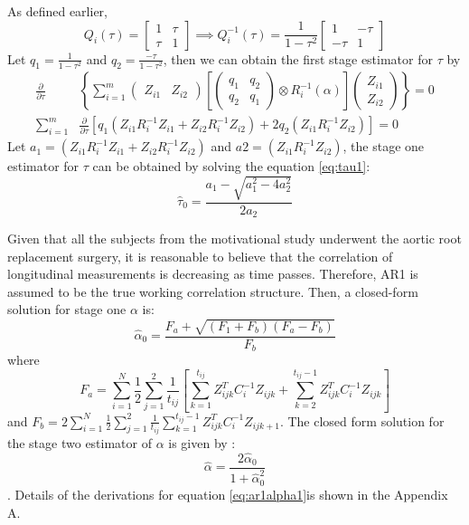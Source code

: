 \documentclass[
]{aft}
\begin{document}
As defined earlier, \[
Q_i(\tau) = 
\begin{bmatrix}
1 & \tau\\
\tau & 1
\end{bmatrix}
\implies 
Q_i^{-1}(\tau) = \frac{1}{1-\tau^2}
\begin{bmatrix}
1 & -\tau\\
-\tau & 1
\end{bmatrix}
\] Let \(q_1 = \frac{1}{1-\tau^2}\) and
\(q_2 = \frac{-\tau}{1-\tau^2}\), then we can obtain the first stage
estimator for \(\tau\) by \begin{align}
\frac{\partial}{\partial \tau}& \left\{
\sum_{i=1}^m 
\begin{pmatrix}
Z_{i1} & Z_{i2}
\end{pmatrix} 
\left[\begin{pmatrix}
q_1 & q_2\\
q_2 & q_1
\end{pmatrix} 
\otimes R_i^{-1}(\alpha)\right] 
\begin{pmatrix}
Z_{i1}\\ Z_{i2}
\end{pmatrix} \right\} = 0 \\
\sum_{i=1}^m &  \frac{\partial}{\partial \tau}\left[q_1(Z_{i1}R_i^{-1}Z_{i1}+Z_{i2}R_i^{-1}Z_{i2}) + 2q_2(Z_{i1}R_i^{-1}Z_{i2})\right]= 0 \label{eq:tau1}
\end{align} Let \(a_1 = (Z_{i1}R_i^{-1}Z_{i1}+Z_{i2}R_i^{-1}Z_{i2})\)
and \(a2 = (Z_{i1}R_i^{-1}Z_{i2})\), the stage one estimator for
\(\tau\) can be obtained by solving the equation \eqref{eq:tau1}: \[
\hat{\tau}_0 = \frac{a_1 - \sqrt{a_1^2 - 4a_2^2}}{2a_2}
\]

Given that all the subjects from the motivational study underwent the
aortic root replacement surgery, it is reasonable to believe that the
correlation of longitudinal measurements is decreasing as time passes.
Therefore, AR1 is assumed to be the true working correlation structure.
Then, a closed-form solution for stage one \(\alpha\) is:
\begin{equation}
\hat{\alpha}_0 = \frac{F_a + \sqrt{(F_1+F_b)(F_a-F_b)}}{F_b} \label{eq:ar1alpha1}
\end{equation} where \[
F_a = \sum_{i=1}^N \frac{1}{2} \sum_{j=1}^2 \frac{1}{t_{ij}}\left[\sum_{k=1}^{t_{ij}} Z_{ijk}^T C_i^{-1} Z_{ijk} + \sum_{k=2}^{t_{ij}-1}Z_{ijk}^T C_i^{-1} Z_{ijk}\right]
\] and
\(F_b = 2\sum_{i=1}^N \frac{1}{2}\sum_{j=1}^2\frac{1}{t_{ij}}\sum_{k=1}^{t_{ij}-1} Z_{ijk}^T C_i^{-1} Z_{ijk+1}\).
The closed form solution for the stage two estimator of \(\alpha\) is
given by \citep{Mitani2019}: \begin{equation}
\hat{\alpha} = \frac{2\hat{\alpha}_0}{1+\hat{\alpha}_0^2} \label{eq:ar1alpha2}
\end{equation}. Details of the derivations for equation
\eqref{eq:ar1alpha1}is shown in the Appendix A.
\end{document}
